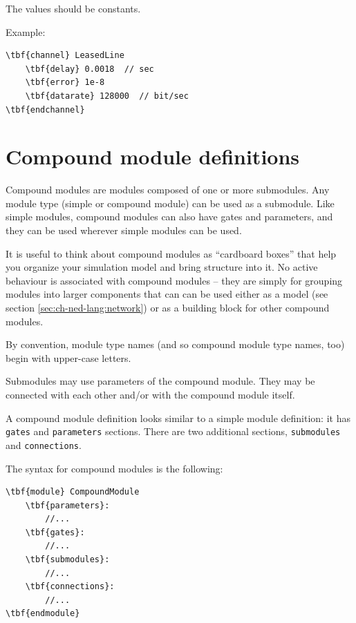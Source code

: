 The values should be constants.

Example:

\begin{Verbatim}[commandchars=\\\{\}]
\tbf{channel} LeasedLine
    \tbf{delay} 0.0018  // sec
    \tbf{error} 1e-8
    \tbf{datarate} 128000  // bit/sec
\tbf{endchannel}
\end{Verbatim}




\section{Compound module definitions}


Compound modules are modules composed of one or more submodules.
Any module type (simple or compound module) can be used as a submodule.
Like simple modules, compound modules can also have gates and parameters,
and they can be used wherever simple modules can be used.

It is useful to think about compound modules as ``cardboard boxes''
that help you organize your simulation model and bring structure into
it. No active behaviour is associated with compound modules -- they
are simply for grouping modules into larger components that can
can be used either as a model (see section \ref{sec:ch-ned-lang:network})
or as a building block for other compound modules.

By convention, module type names (and so compound module type names, too)
begin with upper-case letters.

Submodules may use parameters of the compound module.
They may be connected with each other and/or with
the compound module itself.

A compound module definition looks
similar to a simple module definition:
it has \texttt{gates} and \texttt{parameters} sections.
There are two additional sections, \texttt{submodules} and
\texttt{connections}.

The syntax for compound modules is the following:

\begin{Verbatim}[commandchars=\\\{\}]
\tbf{module} CompoundModule
    \tbf{parameters}:
        //...
    \tbf{gates}:
        //...
    \tbf{submodules}:
        //...
    \tbf{connections}:
        //...
\tbf{endmodule}
\end{Verbatim}

